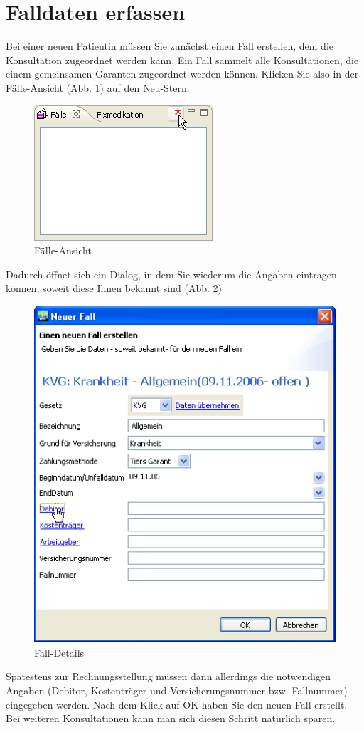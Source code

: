 \section{Falldaten erfassen}
Bei einer neuen Patientin müssen Sie zunächst einen \glqq Fall\grqq{} erstellen, dem
die Konsultation zugeordnet werden kann. Ein Fall sammelt alle Konsultationen, die einem gemeinsamen Garanten
zugeordnet werden können. Klicken Sie also in der \glqq Fälle\grqq{}-Ansicht
(Abb. \ref{fig:faelle}) auf den \glqq Neu\grqq{}-Stern.
\begin{figure}[ht]
	\includegraphics{images/einf3}
	\caption{Fälle-Ansicht}
	\label{fig:faelle}
\end{figure}
Dadurch öffnet sich ein Dialog, in dem Sie wiederum die Angaben eintragen
können, soweit diese Ihnen bekannt sind (Abb. \ref{fig:falldetail})
\begin{figure}[ht]
	\includegraphics{images/einf4}
	\caption{Fall-Details}
	\label{fig:falldetail}
\end{figure}
Spätestens zur Rechnungsstellung müssen dann allerdings die notwendigen Angaben (Debitor, Kostenträger und Versicherungsnummer bzw. Fallnummer)
eingegeben werden.
Nach dem Klick auf OK haben Sie den neuen Fall erstellt. Bei weiteren
Konsultationen kann man sich diesen Schritt natürlich sparen.

